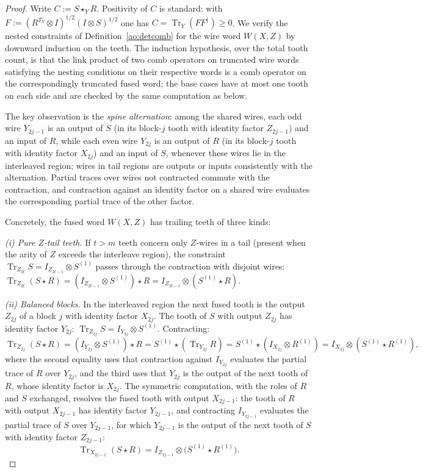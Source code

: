 \documentclass[11pt,a4paper]{article}
\theoremstyle{definition}
\theoremstyle{plain}
\theoremstyle{remark}
\DeclareMathOperator{\Tr}{Tr}
\begin{document}
\begin{proof}
Write $C:=S\star_Y R$. Positivity of $C$ is standard: with
$F:=(R^{T_Y}\otimes I)^{1/2}(I\otimes S)^{1/2}$ one has
$C=\Tr_Y(FF^\dagger)\ge 0$. We verify the nested constraints of
Definition~\ref{ao:detcomb} for the wire word $W(X,Z)$ by downward induction
on the teeth. The induction hypothesis, over the total tooth count, is that
the link product of two comb operators on truncated wire words satisfying
the nesting conditions on their respective words is a comb operator on the
correspondingly truncated fused word; the base cases have at most one tooth
on each side and are checked by the same computation as below.

The key observation is the \emph{spine alternation}: among the shared
wires, each odd wire $Y_{2j-1}$ is an output of $S$ (in its block-$j$ tooth
with identity factor $Z_{2j-1}$) and an input of $R$, while each even wire
$Y_{2j}$ is an output of $R$ (in its block-$j$ tooth with identity factor
$X_{2j}$) and an input of $S$, whenever these wires lie in the interleaved
region; wires in tail regions are outputs or inputs consistently with the
alternation. Partial traces over wires not contracted commute with the
contraction, and contraction against an identity factor on a shared wire
evaluates the corresponding partial trace of the other factor.

Concretely, the fused word $W(X,Z)$ has trailing teeth of three kinds:

\emph{(i) Pure $Z$-tail teeth.} If $t>m$ teeth concern only $Z$-wires in a
tail (present when the arity of $Z$ exceeds the interleave region), the
constraint $\Tr_{Z_{2t}}S=I_{Z_{2t-1}}\otimes S^{(1)}$ passes through the
contraction with disjoint wires:
$\Tr_{Z_{2t}}(S\star R)=(I_{Z_{2t-1}}\otimes S^{(1)})\star R
=I_{Z_{2t-1}}\otimes(S^{(1)}\star R)$.

\emph{(ii) Balanced blocks.} In the interleaved region the next fused tooth
is the output $Z_{2j}$ of a block $j$ with identity factor $X_{2j}$. The
tooth of $S$ with output $Z_{2j}$ has identity factor $Y_{2j}$:
$\Tr_{Z_{2j}}S=I_{Y_{2j}}\otimes S^{(1)}$. Contracting:
\[
\Tr_{Z_{2j}}(S\star R)
=(I_{Y_{2j}}\otimes S^{(1)})\star R
=S^{(1)}\star(\Tr_{Y_{2j}}R)
=S^{(1)}\star(I_{X_{2j}}\otimes R^{(1)})
=I_{X_{2j}}\otimes(S^{(1)}\star R^{(1)}),
\]
where the second equality uses that contraction against $I_{Y_{2j}}$
evaluates the partial trace of $R$ over $Y_{2j}$, and the third uses that
$Y_{2j}$ is the output of the next tooth of $R$, whose identity factor is
$X_{2j}$. The symmetric computation, with the roles of $R$ and $S$
exchanged, resolves the fused tooth with output $X_{2j-1}$: the tooth of
$R$ with output $X_{2j-1}$ has identity factor $Y_{2j-1}$, and contracting
$I_{Y_{2j-1}}$ evaluates the partial trace of $S$ over $Y_{2j-1}$, for
which $Y_{2j-1}$ is the output of the next tooth of $S$ with identity
factor $Z_{2j-1}$:
\[
\Tr_{X_{2j-1}}(S\star R)
=I_{Z_{2j-1}}\otimes\bigl(S^{(1)}\star R^{(1)}\bigr).
\]


\end{proof}
\end{document}
